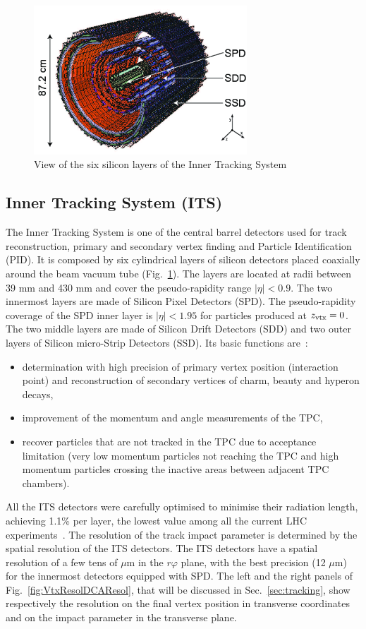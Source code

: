 \begin{figure}[!t]
\centering
\includegraphics[width=8cm]{FigCap3/figures_its-rf-2.png}
\caption{View of the six silicon layers of the Inner Tracking System}
\label{fig:image2}
\end{figure}

\subsection{Inner Tracking System (ITS)}
\label{sec:ITS}
The Inner Tracking System is one of the central barrel detectors used for track 
reconstruction, primary and secondary vertex finding and Particle Identification (PID).
It is composed by six cylindrical layers of silicon detectors placed 
coaxially around the beam vacuum tube (Fig.~\ref{fig:image2}). The layers are located 
at radii between 39 mm and 430 mm and cover the pseudo-rapidity range 
$|\eta|<0.9$. The two innermost layers are made of Silicon Pixel Detectors (SPD). 
The pseudo-rapidity coverage of the SPD inner layer is $|\eta|<1.95$ for particles produced at $z_{\rm vtx}=0$. 
The two middle layers are made of Silicon Drift Detectors (SDD) 
and two outer layers of Silicon micro-Strip Detectors (SSD).
Its basic functions are~\cite{ITS-TDR}:
\begin{itemize}
\item determination with high precision of primary vertex position (interaction point) and reconstruction of secondary vertices 
of charm, beauty and hyperon decays,
\item improvement of the momentum and angle measurements of the TPC,
\item recover particles that are not tracked in the TPC due to acceptance limitation (very low momentum particles
not reaching the TPC and high momentum particles crossing the inactive areas between adjacent TPC chambers).
\end{itemize}
All the ITS detectors were carefully optimised to minimise their radiation 
 length, achieving 1.1\% per layer, the lowest value among all the current LHC experiments~\cite{ITS-TDR}. 
The resolution of the track impact parameter is determined by the spatial resolution of 
the ITS detectors. The ITS detectors have a spatial resolution of a few tens of 
$\mu$m in the $r\varphi$ plane, with the best precision (12  $\mu$m) for the 
innermost detectors equipped with SPD. The left and the right panels of Fig.~\ref{fig:VtxResolDCAResol}, that will be discussed
 in Sec.~\ref{sec:tracking}, show respectively the resolution on the final vertex position in transverse coordinates and on the impact parameter
in the transverse plane. \\
 
